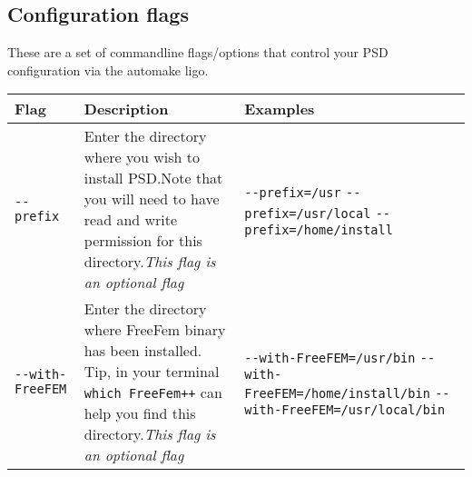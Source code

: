 \subsection{Configuration flags}

These are a set of commandline flags/options that control your PSD
configuration via the automake ligo.

\begin{longtable}[]{@{}lll@{}}
\toprule
\begin{minipage}[b]{0.14\columnwidth}\raggedright\strut
\textbf{Flag}\strut
\end{minipage} & \begin{minipage}[b]{0.39\columnwidth}\raggedright\strut
\textbf{Description}\strut
\end{minipage} & \begin{minipage}[b]{0.39\columnwidth}\raggedright\strut
\textbf{Examples}\strut
\end{minipage}\tabularnewline
\midrule
\endhead
\begin{minipage}[t]{0.14\columnwidth}\raggedright\strut
\lstinline!--prefix!\strut
\end{minipage} & \begin{minipage}[t]{0.39\columnwidth}\raggedright\strut
Enter the directory where you wish to install PSD.Note that you will
need to have read and write permission for this directory.\emph{This
flag is an optional flag}\strut
\end{minipage} & \begin{minipage}[t]{0.39\columnwidth}\raggedright\strut
\lstinline!--prefix=/usr! \lstinline!--prefix=/usr/local!
\lstinline!--prefix=/home/install!\strut
\end{minipage}\tabularnewline
\begin{minipage}[t]{0.14\columnwidth}\raggedright\strut
\lstinline!--with-FreeFEM!\strut
\end{minipage} & \begin{minipage}[t]{0.39\columnwidth}\raggedright\strut
Enter the directory where FreeFem binary has been installed. Tip, in
your terminal \lstinline!which FreeFem++! can help you find this
directory.\emph{This flag is an optional flag}\strut
\end{minipage} & \begin{minipage}[t]{0.39\columnwidth}\raggedright\strut
\lstinline!--with-FreeFEM=/usr/bin!
\lstinline!--with-FreeFEM=/home/install/bin!
\lstinline!--with-FreeFEM=/usr/local/bin!\strut
\end{minipage}\tabularnewline

\end{longtable}
